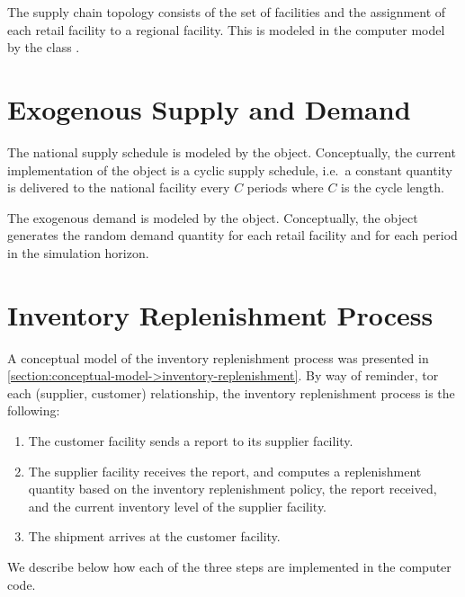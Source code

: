The supply chain topology
consists of the set of facilities
and the assignment of each retail facility to a regional facility.
This is modeled in the computer model
by the class .





\section{Exogenous Supply and Demand}
\label{section:scs->computer-model->supply-and-demand}

The national supply schedule is modeled by
the  object.
Conceptually, the current implementation
of the  object
is a cyclic supply schedule,
i.e.\ a constant quantity is delivered to the national facility
every $C$ periods where $C$ is the cycle length.

The exogenous demand is modeled by the  object.
Conceptually, the  object
generates the random demand quantity
for each retail facility and for each period in the simulation horizon.





\section{Inventory Replenishment Process}
\label{section:scs->computer-model->replenishment-process}

A conceptual model of the inventory replenishment process
was presented in \autoref{section:conceptual-model->inventory-replenishment}.
By way of reminder,
tor each (supplier, customer) relationship,
the inventory replenishment process is the following:
\begin{enumerate}
\item
The customer facility sends a report to its supplier facility.
\item
The supplier facility receives the report,
and computes a replenishment quantity
based on the inventory replenishment policy,
the report received,
and the current inventory level of the supplier facility.
\item
The shipment arrives at the customer facility.
\end{enumerate}

We describe below
how each of the three steps are implemented in the computer code.





